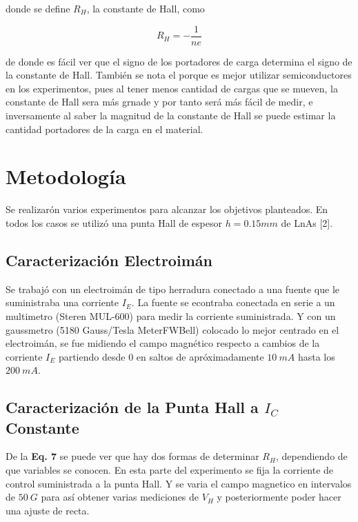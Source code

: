 \documentclass[twocolumn,showpacs,preprintnumbers,amsmath,amssymb]{revtex4-1}
\begin{document}
donde se define $R_H$, la constante de Hall, como

\begin{equation}
R_H = -\frac{1}{ne}
\end{equation}

de donde es fácil ver que el signo de los portadores de carga determina el signo de la constante de Hall. También se nota el porque
es mejor utilizar semiconductores en los experimentos, pues al tener menos cantidad de cargas que se mueven, la constante
de Hall sera más grnade y por tanto será más fácil de medir, e inversamente al saber la magnitud de la constante de Hall
se puede estimar la cantidad portadores de la carga en el material.



\section{Metodología}

Se realizarón varios experimentos para alcanzar los objetivos planteados. En todos los casos se utilizó una punta Hall de espesor $h = 0.15 mm$
de LnAs [2].

\subsection{Caracterización Electroimán}

Se trabajó con un electroimán de tipo herradura conectado a una fuente que le suministraba una corriente $I_E$. La fuente se econtraba
conectada en serie a un multimetro (Steren MUL-600) para medir la corriente suministrada.
Y con un gaussmetro (5180 Gauss/Tesla MeterFWBell) colocado lo mejor centrado en el electroimán, se fue midiendo el campo
magnético respecto a cambios de la corriente $I_E$ partiendo desde $0$ en saltos de apróximadamente $10\ mA$ hasta los $200\ mA$.

\subsection{ Caracterización de la Punta Hall a $I_C$ Constante}

De la \textbf{Eq. 7} se puede ver que hay dos formas de determinar $R_H$, dependiendo de que variables se conocen. En esta parte
del experimento se fija la corriente de control suministrada a la punta Hall. Y se varia el campo magnetico en intervalos de $50\ G$
para así obtener varias mediciones de $V_H$ y posteriormente poder hacer una ajuste de recta.
\end{document}
